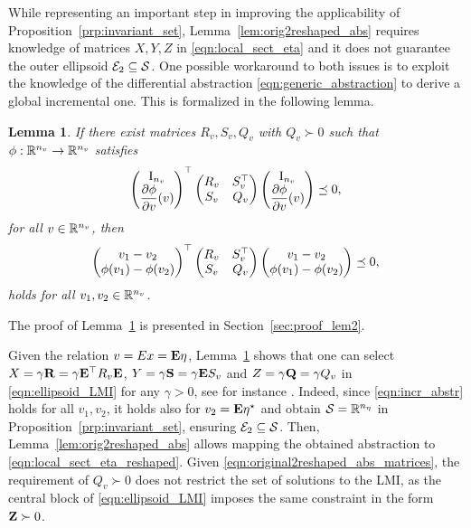 \documentclass{ifacconf}
\newtheorem{lemma}{Lemma}
\begin{document}
While representing an important step in improving the applicability of
Proposition~\ref{prp:invariant_set}, Lemma~\ref{lem:orig2reshaped_abs} requires knowledge of matrices $X,Y,Z$ in \eqref{eqn:local_sect_eta} and it does not guarantee the outer ellipsoid ${\mathcal{E}}_2\subseteq{\mathcal{S}}$.
One possible workaround to both issues is to exploit the knowledge of the differential abstraction \eqref{eqn:generic_abstraction} to derive a global incremental one. This is formalized in the following lemma.
\begin{lemma}
    \label{lem:diff2incr_abstraction}
    If there exist matrices $R_v,S_v, Q_v$ with $Q_v\succ 0$ such that $\phi:{\mathbb{R}}^{n_v}\to{\mathbb{R}}^{n_v}$ satisfies
    \begin{equation}\label{eqn:diff_abstr}
    \left(\begin{matrix}\operatorname{I}_{n_v}\\\dfrac{\partial \phi}{\partial v}(v)\end{matrix}\right)^\top\left(\begin{matrix}R_v&S_v^\top\\S_v&Q_v\end{matrix}\right)\left(\begin{matrix}\operatorname{I}_{n_v}\\\dfrac{\partial \phi}{\partial v}(v)\end{matrix}\right)\preceq 0,
    \end{equation}
    for all $v\in {\mathbb{R}}^{n_v}$, then 
    \begin{equation}\label{eqn:incr_abstr}
        \left(\begin{matrix}v_1-v_2\\\phi(v_1)-\phi(v_2)\end{matrix}\right)^\top\left(\begin{matrix}R_v&S_v^\top\\S_v&Q_v\end{matrix}\right)\left(\begin{matrix}v_1-v_2\\\phi(v_1)-\phi(v_2)\end{matrix}\right)\preceq 0,
    \end{equation}
    holds for all $v_1,v_2\in{\mathbb{R}}^{n_v}$.
\end{lemma}
The proof of Lemma~\ref{lem:diff2incr_abstraction} is presented in Section~\ref{sec:proof_lem2}.

Given the relation $v=Ex={\bf{E}}\eta$, Lemma~\ref{lem:diff2incr_abstraction} shows that one can select $X = \gamma{\bf{R}} = \gamma {\bf{E}}^\top R_v {\bf{E}}$, $Y=\gamma {\bf{S}} = \gamma {\bf{E}} S_v$ and $Z=\gamma {\bf{Q}} = \gamma Q_v$ in \eqref{eqn:ellipsoid_LMI} for any $\gamma>0$, see for instance \citep[Section 2.5]{zoboli2024dynamic}. Indeed, since \eqref{eqn:incr_abstr} holds for all $v_1,v_2$, it holds also for $v_2={\bf{E}}\eta^\star$ and obtain ${\mathcal{S}}={\mathbb{R}}^{n_\eta}$ in Proposition~\ref{prp:invariant_set}, ensuring ${\mathcal{E}}_2\subseteq{\mathcal{S}}$. Then, Lemma~\ref{lem:orig2reshaped_abs} allows mapping the obtained abstraction to \eqref{eqn:local_sect_eta_reshaped}. Given \eqref{eqn:original2reshaped_abs_matrices}, the requirement of $Q_v\succ0$ does not restrict the set of solutions to the LMI, as the central block of \eqref{eqn:ellipsoid_LMI} imposes the same constraint in the form ${\bf{Z}}\succ 0$.
\end{document}

